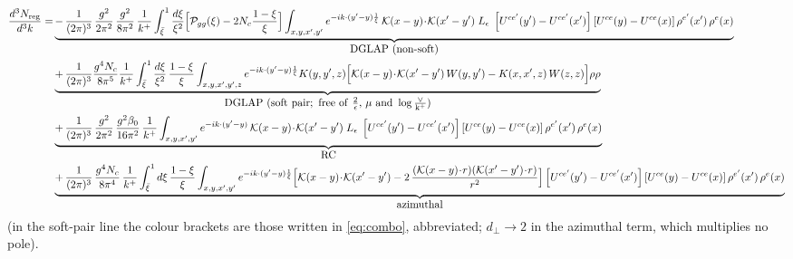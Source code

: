 \documentclass[9pt]{article}
\newcommand{\Leps}{L_{\epsilon}}
\newcommand{\KK}{\mathcal K(x-y)\!\cdot\!\mathcal K(x'-y')}
\newcommand{\Wyy}{\left[U^{ce'}(y') - U^{ce'}(x')\right] \left[U^{ce}(y) - U^{ce}(x)\right] \rho^{e'}(x')\, \rho^{e}(x)}
\begin{document}
\begin{align}\label{eq:reg}
\frac{d^{3}N_{\rm reg}}{d^{3}k}
=&\underbrace{-\,\frac{1}{(2\pi)^{3}}\,\frac{g^{2}}{2\pi^{2}}\,\frac{g^{2}}{8\pi^{2}}\,\frac{1}{k^{+}}
\int_{\bar\xi}^{1}\frac{d\xi}{\xi^{2}}\Big[\mathcal P_{gg}(\xi)-2N_{c}\frac{1-\xi}{\xi}\Big]
\int_{x,y,x',y'}e^{-ik\cdot(y'-y)\frac{1}{\xi}}\,\KK\;\Leps\;\Wyy}_{\textstyle\rm DGLAP\ (non\text{-}soft)}\notag\\
&\underbrace{+\,\frac{1}{(2\pi)^{3}}\frac{g^{4}N_{c}}{8\pi^{5}}\frac{1}{k^{+}}
\int_{\bar\xi}^{1}\frac{d\xi}{\xi^{2}}\,\frac{1-\xi}{\xi}
\int_{x,y,x',y',z}e^{-ik\cdot(y'-y)\frac{1}{\xi}}K(y,y',z)
\Big[\KK\,W(y,y')-K(x,x',z)\,W(z,z)\Big]\rho\rho}_{\textstyle\rm DGLAP\ (soft\ pair;\ free\ of\ \frac{2}{\epsilon},\,\mu\ and\ \log\frac{\vee}{k^{+}})}\notag\\
&\underbrace{+\,\frac{1}{(2\pi)^{3}}\,\frac{g^{2}}{2\pi^{2}}\,\frac{g^{2}\beta_{0}}{16\pi^{2}}\,\frac{1}{k^{+}}
\int_{x,y,x',y'}e^{-ik\cdot(y'-y)}\,\KK\;\Leps\;\Wyy}_{\textstyle\rm RC}\notag\\
&\underbrace{+\,\frac{1}{(2\pi)^{3}}\,\frac{g^{4}N_{c}}{8\pi^{4}}\,\frac{1}{k^{+}}
\int_{\bar\xi}^{1}d\xi\,\frac{1-\xi}{\xi}
\int_{x,y,x',y'}e^{-ik\cdot(y'-y)\frac{1}{\xi}}
\Big[\KK-2\,\frac{(\mathcal K(x-y)\!\cdot\!r)(\mathcal K(x'-y')\!\cdot\!r)}{r^{2}}\Big]\Wyy}_{\textstyle\rm azimuthal}
\end{align}
(in the soft-pair line the colour brackets are those written in \eqref{eq:combo}, abbreviated;
$d_{\perp}\to2$ in the azimuthal term, which multiplies no pole).
\end{document}

